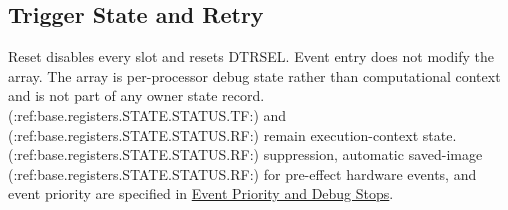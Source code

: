 \subsection{Trigger State and Retry}
Reset disables every slot and resets DTRSEL. Event entry does not modify the array. The array is per-processor debug
state rather than computational context and is not part of any owner state record. (:ref:base.registers.STATE.STATUS.TF:) and (:ref:base.registers.STATE.STATUS.RF:)
remain execution-context state. (:ref:base.registers.STATE.STATUS.RF:) suppression, automatic saved-image (:ref:base.registers.STATE.STATUS.RF:) for pre-effect hardware events, and event
priority are specified in \hyperref[section:event-priority-and-debug]{Event Priority and Debug Stops}.
